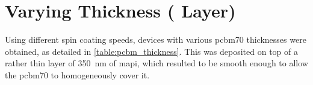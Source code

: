 
\section{Varying  Thickness ( Layer)}
	Using different spin coating speeds, devices with various \gls{pcbm70} thicknesses were obtained, as detailed in \cref{table:pcbm_thickness}.
	This was deposited on top of a rather thin layer of \SI{350}{\nm} of \gls{mapi}, which resulted to be smooth enough to allow the \gls{pcbm70} to homogeneously cover it.


